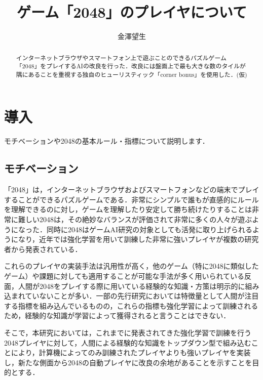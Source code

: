 \documentclass{suribt}
\title{ゲーム「2048」のプレイヤについて}
\author{金澤望生}
\begin{document}
\maketitle

\frontmatter
\begin{abstract}
インターネットブラウザやスマートフォン上で遊ぶことのできるパズルゲーム「2048」をプレイするAIの改良を行った．改良には盤面上で最も大きな数のタイルが隅にあることを重視する独自のヒューリスティック「corner bonus」を使用した．(仮)
\end{abstract}

\tableofcontents

\mainmatter
\chapter{導入}
モチベーションや2048の基本ルール・指標について説明します．

\section{モチベーション}
「2048」は，インターネットブラウザおよびスマートフォンなどの端末でプレイすることができるパズルゲームである．非常にシンプルで誰もが直感的にルールを理解できるのに対し，ゲームを理解したり安定して勝ち続けたりすることは非常に難しい2048は，その絶妙なバランスが評価されて非常に多くの人々が遊ぶようになった．同時に2048はゲームAI研究の対象としても活発に取り上げられるようになり，近年では強化学習を用いて訓練した非常に強いプレイヤが複数の研究者から発表されている．

これらのプレイヤの実装手法は汎用性が高く，他のゲーム（特に2048に類似したゲーム）や課題に対しても適用することが可能な手法が多く用いられている反面，人間が2048をプレイする際に用いている経験的な知識・方策は明示的に組み込まれていないことが多い．一部の先行研究においては特徴量として人間が注目する指標を組み込んでいるものの，これらの指標も強化学習によって訓練されるため，経験的な知識が学習によって獲得されると言うことはできない．

そこで，本研究においては，これまでに発表されてきた強化学習で訓練を行う2048プレイヤに対して，人間による経験的な知識をトップダウン型で組み込むことにより，計算機によってのみ訓練されたプレイヤよりも強いプレイヤを実装し，新たな側面から2048の自動プレイヤに改良の余地があることを示すことを目的とする．
\end{document}
